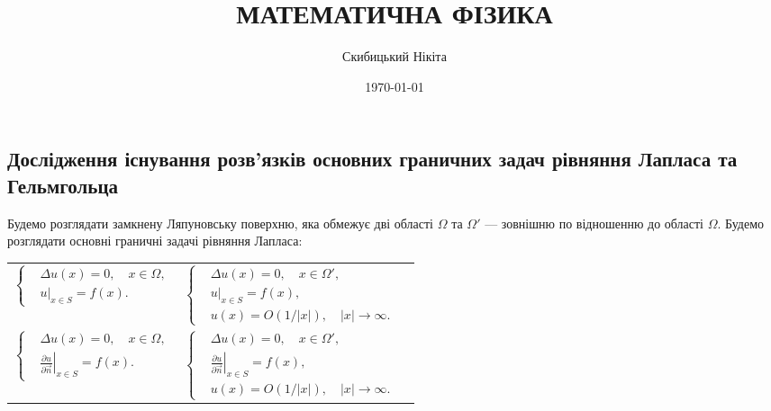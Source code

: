 

\title{{\Huge МАТЕМАТИЧНА ФІЗИКА}}
\author{Скибицький Нікіта}
\date{\today}
 




\tableofcontents

\setcounter{section}{4}
\setcounter{subsection}{8}

\subsection{Дослідження існування розв'язків основних граничних задач рівняння Лапласа та Гельмгольца}

Будемо розглядати замкнену Ляпуновську поверхню, яка обмежує дві області $\Omega$ та $\Omega'$ --- зовнішню по відношенню до області $\Omega$. Будемо розглядати основні граничні задачі рівняння Лапласа:
\begin{longtable}{p{} p{} p{}}
	\parbox{.45\textwidth}{\begin{equation}\label{eq:4.9.1}\left\{\begin{aligned}
		& \Delta u(x) = 0, \quad x \in \Omega, \\
		& \left. u \right|_{x \in S} = f(x).
	\end{aligned}\right.\end{equation}} & \parbox{.45\textwidth}{\begin{equation}\label{eq:4.9.1'}\left\{\begin{aligned}
		& \Delta u(x) = 0, \quad x \in \Omega', \\
		& \left. u \right|_{x \in S} = f(x), \\
		& u(x) = O(1/|x|), \quad |x| \to \infty.
	\end{aligned}\right.\end{equation}} \\
	\parbox{.45\textwidth}{\begin{equation}\label{eq:4.9.2}\left\{\begin{aligned}
		& \Delta u(x) = 0, \quad x \in \Omega, \\
		& \left. \frac{\partial u}{\partial \vec n} \right|_{x \in S} = f(x).
	\end{aligned}\right.\end{equation}} & \parbox{.45\textwidth}{\begin{equation}\label{eq:4.9.2'}\left\{\begin{aligned}
		& \Delta u(x) = 0, \quad x \in \Omega', \\
		& \left. \frac{\partial u}{\partial \vec n} \right|_{x \in S} = f(x), \\
		& u(x) = O(1/|x|), \quad |x| \to \infty.
	\end{aligned}\right.\end{equation}}
\end{longtable}

